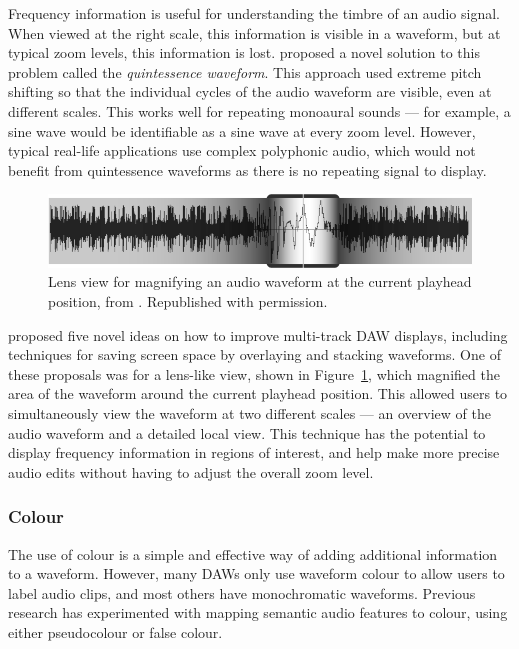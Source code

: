 Frequency information is useful for understanding the timbre of an audio signal. When viewed at the right scale, this
information is visible in a waveform, but at typical zoom levels, this information is lost. \citet{Loviscach2011}
proposed a novel solution to this problem called the \textit{quintessence waveform}. This approach used extreme pitch
shifting so that the individual cycles of the audio waveform are visible, even at different scales.  This works well
for repeating monoaural sounds --- for example, a sine wave would be identifiable as a sine wave at every zoom level.
However, typical real-life applications use complex polyphonic audio, which would not benefit from quintessence
waveforms as there is no repeating signal to display.


\begin{figure}[t]
  \centering
  \includegraphics[width=.8\textwidth]{figs/Gohlke2010.png}
  \caption{Lens view for magnifying an audio waveform at the current playhead position, from \citet{Gohlke2010}.
  Republished with permission.}
  \label{fig:Gohlke2010}
\end{figure}


\citet{Gohlke2010} proposed five novel ideas on how to improve multi-track DAW displays, including techniques for
saving screen space by overlaying and stacking waveforms. One of these proposals was for a lens-like view, shown in
Figure~\ref{fig:Gohlke2010}, which magnified the area of the waveform around the current playhead position. This
allowed users to simultaneously view the waveform at two different scales --- an overview of the audio waveform and a
detailed local view. This technique has the potential to display frequency information in regions of interest, and help
make more precise audio edits without having to adjust the overall zoom level.


\subsubsection{Colour}
The use of colour is a simple and effective way of adding additional information to a waveform.  However, many DAWs
only use waveform colour to allow users to label audio clips, and most others have monochromatic waveforms.  Previous
research has experimented with mapping semantic audio features to colour, using either pseudocolour or false colour.

